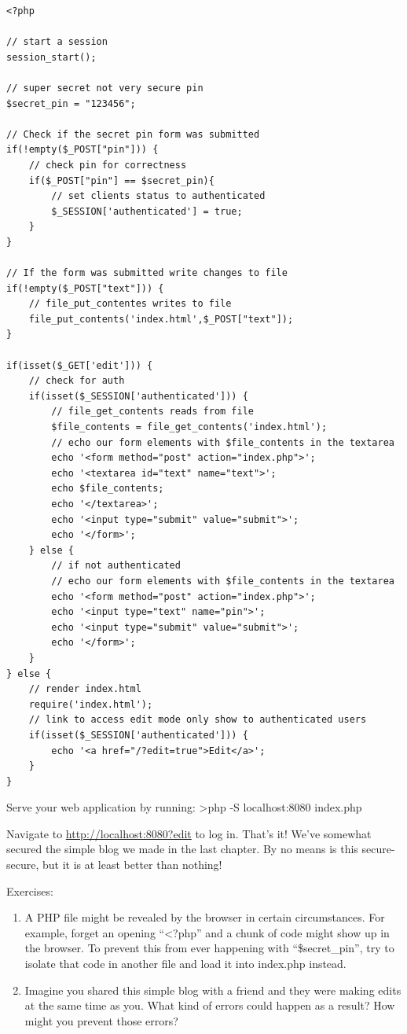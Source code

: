 \documentclass[
]{book}
\begin{document}
\begin{verbatim}
<?php

// start a session
session_start();

// super secret not very secure pin
$secret_pin = "123456";

// Check if the secret pin form was submitted
if(!empty($_POST["pin"])) {
    // check pin for correctness
    if($_POST["pin"] == $secret_pin){
        // set clients status to authenticated
        $_SESSION['authenticated'] = true;
    }
}

// If the form was submitted write changes to file
if(!empty($_POST["text"])) {
    // file_put_contentes writes to file
    file_put_contents('index.html',$_POST["text"]);
}

if(isset($_GET['edit'])) {
    // check for auth
    if(isset($_SESSION['authenticated'])) {
        // file_get_contents reads from file
        $file_contents = file_get_contents('index.html');
        // echo our form elements with $file_contents in the textarea
        echo '<form method="post" action="index.php">';
        echo '<textarea id="text" name="text">';
        echo $file_contents;
        echo '</textarea>';
        echo '<input type="submit" value="submit">';
        echo '</form>';
    } else {
        // if not authenticated
        // echo our form elements with $file_contents in the textarea
        echo '<form method="post" action="index.php">';
        echo '<input type="text" name="pin">';
        echo '<input type="submit" value="submit">';
        echo '</form>';
    }
} else {
    // render index.html
    require('index.html');
    // link to access edit mode only show to authenticated users
    if(isset($_SESSION['authenticated'])) {
        echo '<a href="/?edit=true">Edit</a>';
    }
}
\end{verbatim}

Serve your web application by running: \textgreater php -S localhost:8080 index.php

Navigate to \url{http://localhost:8080?edit} to log in. That's it! We've somewhat secured the simple blog we made in the last chapter. By no means is this secure-secure, but it is at least better than nothing!

Exercises:

\begin{enumerate}
\def\labelenumi{\arabic{enumi}.}
\item
  A PHP file might be revealed by the browser in certain circumstances. For example, forget an opening ``\textless?php'' and a chunk of code might show up in the browser. To prevent this from ever happening with ``\$secret\_pin'', try to isolate that code in another file and load it into index.php instead.
\item
  Imagine you shared this simple blog with a friend and they were making edits at the same time as you. What kind of errors could happen as a result? How might you prevent those errors?
\end{enumerate}
\end{document}
